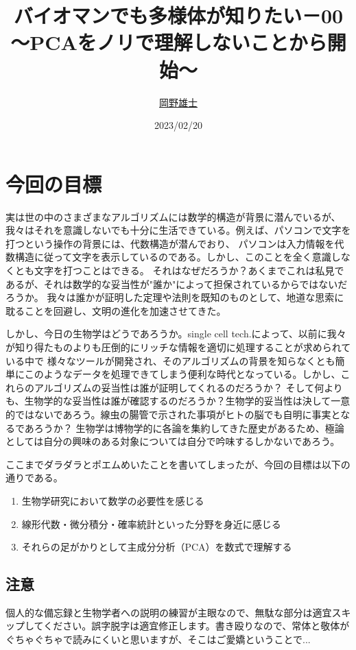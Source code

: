 \documentclass[10pt]{ujarticle}
\title{バイオマンでも多様体が知りたい－00\\〜PCAをノリで理解しないことから開始〜}
\author{\href{mailto:yujiokano@keio.jp}{岡野雄士}}
\date{2023/02/20}
\begin{document}
\maketitle
\section{今回の目標}
実は世の中のさまざまなアルゴリズムには数学的構造が背景に潜んでいるが、我々はそれを意識しないでも十分に生活できている。例えば、パソコンで文字を打つという操作の背景には、代数構造が潜んでおり、
パソコンは入力情報を代数構造に従って文字を表示しているのである。しかし、このことを全く意識しなくとも文字を打つことはできる。
それはなぜだろうか？あくまでこれは私見であるが、それは数学的な妥当性が"誰か"によって担保されているからではないだろうか。
我々は誰かが証明した定理や法則を既知のものとして、地道な思索に耽ることを回避し、文明の進化を加速させてきた。

しかし、今日の生物学はどうであろうか。single cell tech.によって、以前に我々が知り得たものよりも圧倒的にリッチな情報を適切に処理することが求められている中で
様々なツールが開発され、そのアルゴリズムの背景を知らなくとも簡単にこのようなデータを処理できてしまう便利な時代となっている。しかし、これらのアルゴリズムの妥当性は誰が証明してくれるのだろうか？
そして何よりも、生物学的な妥当性は誰が確認するのだろうか？生物学的妥当性は決して一意的ではないであろう。線虫の腸管で示された事項がヒトの脳でも自明に事実となるであろうか？
生物学は博物学的に各論を集約してきた歴史があるため、極論としては自分の興味のある対象については自分で吟味するしかないであろう。

ここまでダラダラとポエムめいたことを書いてしまったが、今回の目標は以下の通りである。

\begin{enumerate}
  \item 生物学研究において数学の必要性を感じる
  \item 線形代数・微分積分・確率統計といった分野を身近に感じる
  \item それらの足がかりとして主成分分析（PCA）を数式で理解する
\end{enumerate}

\subsection{注意}
個人的な備忘録と生物学者への説明の練習が主眼なので、無駄な部分は適宜スキップしてください。誤字脱字は適宜修正します。書き殴りなので、常体と敬体がぐちゃぐちゃで読みにくいと思いますが、そこはご愛嬌ということで...
\end{document}
